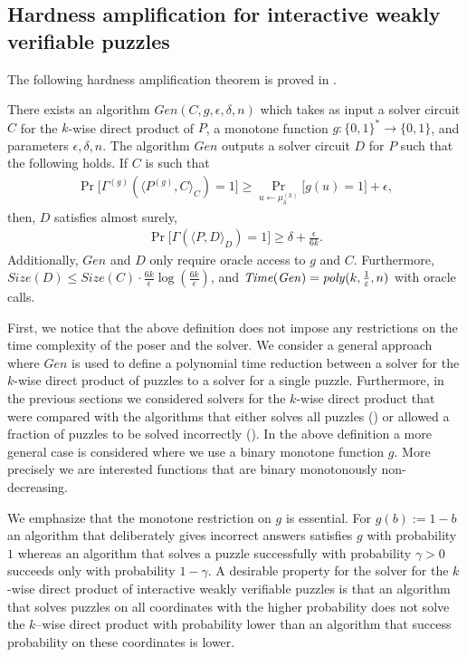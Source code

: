 \subsection{Hardness amplification for interactive weakly verifiable puzzles}
The following hardness amplification theorem is proved in \cite{DBLP:journals/corr/abs-1002-3534}.
\begin{theorem}
There exists an algorithm $\mathit{Gen}(C,g,\epsilon, \delta, n)$ which takes as input a solver circuit $C$ for the $k$-wise
direct product of $P$, a monotone function $g: \{0,1\}^{*} \rightarrow \{0,1\}$, and parameters $\epsilon,\delta,n$.
The algorithm $\mathit{Gen}$ outputs a solver circuit $D$ for $P$ such that the following holds.
If $C$ is such that
\begin{align*}
\Pr\Big[\Gamma^{(g)}(\langle P^{(g)}, C \rangle_C) = 1\Big] \geq \Pr_{u \leftarrow \mu_{\delta}^{(k)}} \Big[ g(u) = 1 \Big] + \epsilon,
\end{align*}
then, $D$ satisfies almost surely,
\begin{align*}
  \Pr\Big[ \Gamma(\langle P, D\rangle_{D}) = 1\Big] \geq \delta + \frac{\epsilon}{6k}.
\end{align*}
Additionally, $\mathit{Gen}$ and $D$ only require oracle access to $g$ and $C$.
Furthermore, $\mathit{Size}(D) \leq \mathit{Size}(C) \cdot \frac{6k}{\epsilon} \log(\frac{6k}{\epsilon})$,
and $\operatorname{\mathit{Time}} (\mathit{Gen}) = \operatorname{\mathit{poly}}(k, \frac{1}{\varepsilon}, n)$ with oracle calls.
\end{theorem}

First, we notice that the above definition does not impose any restrictions on the time complexity of the poser and the solver.
We consider a general approach where $\mathit{Gen}$ is used to define a polynomial time reduction between a solver for the $k$-wise
direct product of puzzles to a solver for a single puzzle.
Furthermore, in the previous sections we considered solvers for the $k$-wise direct product that were compared with the algorithms that either
solves all puzzles (\cite{canetti2004hardness}) or allowed a fraction of puzzles to be solved incorrectly (\cite{Dodis:2009:SAI:1530441.1530450}).
In the above definition a more general case is considered where we use a binary monotone function $g$.
More precisely we are interested functions that are binary monotonously non-decreasing.

We emphasize that the monotone restriction on $g$ is essential. For $g(b) := 1 - b$ an algorithm that
deliberately gives incorrect answers satisfies $g$ with probability $1$ whereas an algorithm that solves a puzzle successfully with probability
$\gamma > 0$ succeeds only with probability $1 - \gamma$.
A desirable property for the solver for the $k$-wise direct product of interactive weakly verifiable puzzles is that
an algorithm that solves puzzles on all coordinates with the higher probability
does not solve the $k$--wise direct product with probability lower than an algorithm
that success probability on these coordinates is lower.

